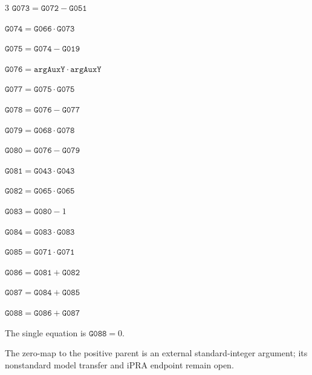 \documentclass[10pt]{article}
\begin{document}
\begin{multicols}{3}
\noindent $\mathtt{G073}=\mathtt{G072}-\mathtt{G051}$\par
\noindent $\mathtt{G074}=\mathtt{G066}\cdot \mathtt{G073}$\par
\noindent $\mathtt{G075}=\mathtt{G074}-\mathtt{G019}$\par
\noindent $\mathtt{G076}=\mathtt{argAuxY}\cdot \mathtt{argAuxY}$\par
\noindent $\mathtt{G077}=\mathtt{G075}\cdot \mathtt{G075}$\par
\noindent $\mathtt{G078}=\mathtt{G076}-\mathtt{G077}$\par
\noindent $\mathtt{G079}=\mathtt{G068}\cdot \mathtt{G078}$\par
\noindent $\mathtt{G080}=\mathtt{G076}-\mathtt{G079}$\par
\noindent $\mathtt{G081}=\mathtt{G043}\cdot \mathtt{G043}$\par
\noindent $\mathtt{G082}=\mathtt{G065}\cdot \mathtt{G065}$\par
\noindent $\mathtt{G083}=\mathtt{G080}-1$\par
\noindent $\mathtt{G084}=\mathtt{G083}\cdot \mathtt{G083}$\par
\noindent $\mathtt{G085}=\mathtt{G071}\cdot \mathtt{G071}$\par
\noindent $\mathtt{G086}=\mathtt{G081}+\mathtt{G082}$\par
\noindent $\mathtt{G087}=\mathtt{G084}+\mathtt{G085}$\par
\noindent $\mathtt{G088}=\mathtt{G086}+\mathtt{G087}$\par
\end{multicols}
The single equation is $\boxed{\mathtt{G088}=0}$.
\par\small The zero-map to the positive parent is an external standard-integer argument; its nonstandard model transfer and iPRA endpoint remain open.
\end{document}
